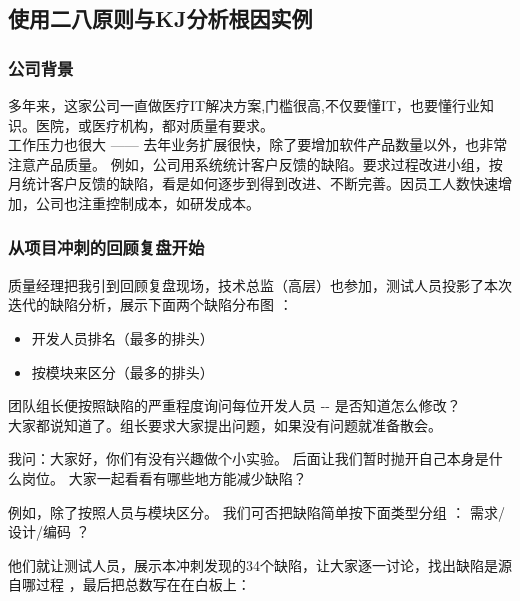 \hypertarget{ux4f7fux7528ux4e8cux516bux539fux5219ux4e0ekjux5206ux6790ux6839ux56e0ux5b9eux4f8b}{%
\subsection{使用二八原则与KJ分析根因实例}\label{ux4f7fux7528ux4e8cux516bux539fux5219ux4e0ekjux5206ux6790ux6839ux56e0ux5b9eux4f8b}}

\hypertarget{ux516cux53f8ux80ccux666f}{%
\subsubsection{公司背景}\label{ux516cux53f8ux80ccux666f}}

多年来，这家公司一直做医疗IT解决方案,门槛很高,不仅要懂IT，也要懂行业知识。医院，或医疗机构，都对质量有要求。\\
工作压力也很大 ------
去年业务扩展很快，除了要增加软件产品数量以外，也非常注意产品质量。
例如，公司用系统统计客户反馈的缺陷。要求过程改进小组，按月统计客户反馈的缺陷，看是如何逐步到得到改进、不断完善。因员工人数快速增加，公司也注重控制成本，如研发成本。

\hypertarget{ux4eceux9879ux76eeux51b2ux523aux7684ux56deux987eux590dux76d8ux5f00ux59cb}{%
\subsubsection{从项目冲刺的回顾复盘开始}\label{ux4eceux9879ux76eeux51b2ux523aux7684ux56deux987eux590dux76d8ux5f00ux59cb}}

质量经理把我引到回顾复盘现场，技术总监（高层）也参加，测试人员投影了本次迭代的缺陷分析，展示下面两个缺陷分布图
：

\begin{itemize}
\tightlist
\item
  开发人员排名（最多的排头）
\item
  按模块来区分（最多的排头）
\end{itemize}

团队组长便按照缺陷的严重程度询问每位开发人员 -\/- 是否知道怎么修改？\\
大家都说知道了。组长要求大家提出问题，如果没有问题就准备散会。

我问：大家好，你们有没有兴趣做个小实验。
后面让我们暂时抛开自己本身是什么岗位。
大家一起看看有哪些地方能减少缺陷？

例如，除了按照人员与模块区分。 我们可否把缺陷简单按下面类型分组 ：
需求/设计/编码 ？

他们就让测试人员，展示本冲刺发现的34个缺陷，让大家逐一讨论，找出缺陷是源自哪过程
，最后把总数写在在白板上：

